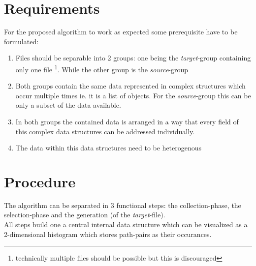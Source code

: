 \documentclass[conference]{IEEEtran}
\begin{document}
\section{Requirements}
For the proposed algorithm to work as expected some prerequisite have to be formulated:
\begin{enumerate}[label=(\roman*)]
 \item Files should be separable into 2 groups: one being the \textit{target}-group containing
        only one file \footnote{technically multiple files should be possible but this is
        discouraged}. While the other group is the \textit{source}-group
 \item Both groups contain the same data represented in complex structures which occur multiple
        times ie. it is a list of objects. For the \textit{source}-group this can be only a
        subset of the data available.
 \item In both groups the contained data is arranged in a way that every field of this complex
        data structures can be addressed individually.
 \item The data within this data structures need to be heterogenous
\end{enumerate}

\section{Procedure}
The algorithm can be separated in 3 functional steps: the collection-phase, the selection-phase
and the generation (of the \textit{target}-file).\\All steps build one a central internal data
structure which can be visualized as a 2-dimensional histogram which stores path-pairs as their
occurances.
\end{document}
